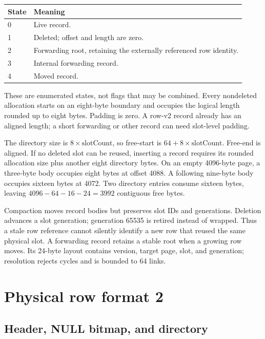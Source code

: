 \begin{longtable}{p{.17\linewidth}p{.72\linewidth}}
\toprule State & Meaning \\\midrule
0 & Live record. \\
1 & Deleted; offset and length are zero. \\
2 & Forwarding root, retaining the externally referenced row identity. \\
3 & Internal forwarding record. \\
4 & Moved record. \\
\bottomrule
\end{longtable}

These are enumerated states, not flags that may be combined. Every nondeleted allocation starts on an eight-byte boundary and occupies the logical length rounded up to eight bytes. Padding is zero. A row-v2 record already has an aligned length; a short forwarding or other record can need slot-level padding.

The directory size is $8\times\mathrm{slotCount}$, so free-start is $64+8\times\mathrm{slotCount}$. Free-end is aligned. If no deleted slot can be reused, inserting a record requires its rounded allocation size plus another eight directory bytes. On an empty 4096-byte page, a three-byte body occupies eight bytes at offset 4088. A following nine-byte body occupies sixteen bytes at 4072. Two directory entries consume sixteen bytes, leaving $4096-64-16-24=3992$ contiguous free bytes.

Compaction moves record bodies but preserves slot IDs and generations. Deletion advances a slot generation; generation 65535 is retired instead of wrapped. Thus a stale row reference cannot silently identify a new row that reused the same physical slot. A forwarding record retains a stable root when a growing row moves. Its 24-byte  layout contains version, target page, slot, and generation; resolution rejects cycles and is bounded to 64 links.


\section{Physical row format 2}
\subsection{Header, NULL bitmap, and directory}

